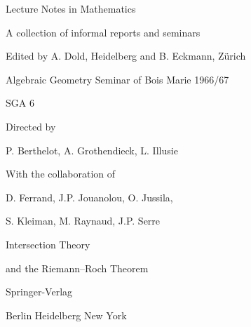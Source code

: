 \begin{center}
{\Large Lecture Notes in Mathematics}\par
A collection of informal reports and seminars\par
Edited by A. Dold, Heidelberg and B. Eckmann, Zürich\par
{}\par
\bigskip
Algebraic Geometry Seminar of Bois Marie 1966/67\par
SGA 6\par
Directed by\par
P. Berthelot, A. Grothendieck, L. Illusie\par
With the collaboration of\par
D. Ferrand, J.P. Jouanolou, O. Jussila,\par
S. Kleiman, M. Raynaud, J.P. Serre\par
\bigskip
{\Large Intersection Theory\par
and the Riemann--Roch Theorem}\par
\bigskip
Springer-Verlag\par
Berlin \textperiodcentered{} Heidelberg \textperiodcentered{} New York
\end{center}

